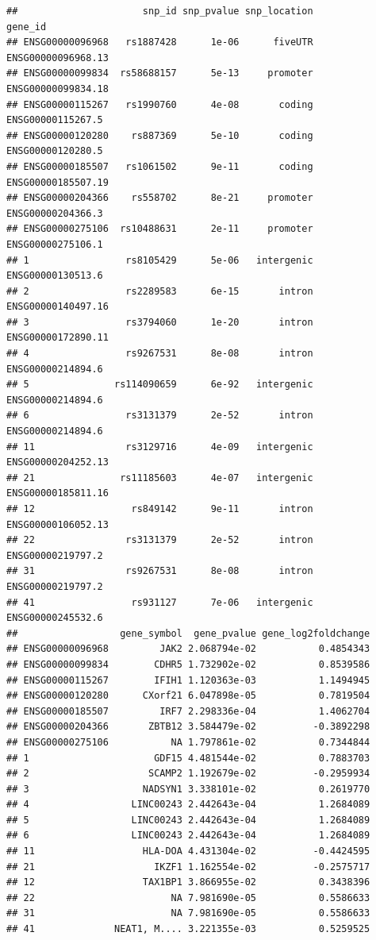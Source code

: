 \documentclass[9pt,a4paper,]{extarticle}
\begin{document}
\begin{verbatim}
##                      snp_id snp_pvalue snp_location            gene_id
## ENSG00000096968   rs1887428      1e-06      fiveUTR ENSG00000096968.13
## ENSG00000099834  rs58688157      5e-13     promoter ENSG00000099834.18
## ENSG00000115267   rs1990760      4e-08       coding  ENSG00000115267.5
## ENSG00000120280    rs887369      5e-10       coding  ENSG00000120280.5
## ENSG00000185507   rs1061502      9e-11       coding ENSG00000185507.19
## ENSG00000204366    rs558702      8e-21     promoter  ENSG00000204366.3
## ENSG00000275106  rs10488631      2e-11     promoter  ENSG00000275106.1
## 1                 rs8105429      5e-06   intergenic  ENSG00000130513.6
## 2                 rs2289583      6e-15       intron ENSG00000140497.16
## 3                 rs3794060      1e-20       intron ENSG00000172890.11
## 4                 rs9267531      8e-08       intron  ENSG00000214894.6
## 5               rs114090659      6e-92   intergenic  ENSG00000214894.6
## 6                 rs3131379      2e-52       intron  ENSG00000214894.6
## 11                rs3129716      4e-09   intergenic ENSG00000204252.13
## 21               rs11185603      4e-07   intergenic ENSG00000185811.16
## 12                 rs849142      9e-11       intron ENSG00000106052.13
## 22                rs3131379      2e-52       intron  ENSG00000219797.2
## 31                rs9267531      8e-08       intron  ENSG00000219797.2
## 41                 rs931127      7e-06   intergenic  ENSG00000245532.6
##                  gene_symbol  gene_pvalue gene_log2foldchange
## ENSG00000096968         JAK2 2.068794e-02           0.4854343
## ENSG00000099834        CDHR5 1.732902e-02           0.8539586
## ENSG00000115267        IFIH1 1.120363e-03           1.1494945
## ENSG00000120280      CXorf21 6.047898e-05           0.7819504
## ENSG00000185507         IRF7 2.298336e-04           1.4062704
## ENSG00000204366       ZBTB12 3.584479e-02          -0.3892298
## ENSG00000275106           NA 1.797861e-02           0.7344844
## 1                      GDF15 4.481544e-02           0.7883703
## 2                     SCAMP2 1.192679e-02          -0.2959934
## 3                    NADSYN1 3.338101e-02           0.2619770
## 4                  LINC00243 2.442643e-04           1.2684089
## 5                  LINC00243 2.442643e-04           1.2684089
## 6                  LINC00243 2.442643e-04           1.2684089
## 11                   HLA-DOA 4.431304e-02          -0.4424595
## 21                     IKZF1 1.162554e-02          -0.2575717
## 12                   TAX1BP1 3.866955e-02           0.3438396
## 22                        NA 7.981690e-05           0.5586633
## 31                        NA 7.981690e-05           0.5586633
## 41              NEAT1, M.... 3.221355e-03           0.5259525
\end{verbatim}
\end{document}

